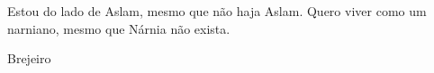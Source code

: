 \null %
\vfill
\epigraph{Estou do lado de Aslam, mesmo que não haja Aslam. Quero viver como um narniano, mesmo que Nárnia não exista.}{Brejeiro}
